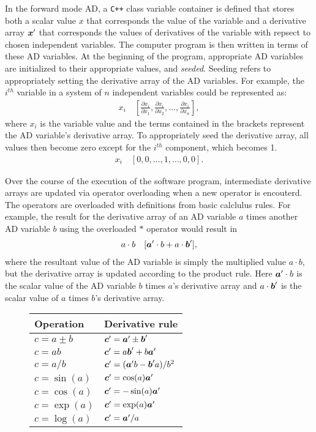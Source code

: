 In the forward mode AD, a \texttt{C++} class variable container is defined
that stores both a scalar value $x$ that corresponds the value of the variable
and a derivative array $\boldsymbol{x}'$ that corresponds the values of derivatives of
the variable with repsect to chosen independent variables. The computer
program is then written in terms of these AD variables. At the beginning of
the program, appropriate AD variables are initialized to their appropriate
values, and \emph{seeded}. Seeding refers to appropriately setting the
derivative array of the AD variables. For example, the $i^{th}$ variable in a
system of $n$ independent variables could be represented as:
%
\begin{gather}
x_i \quad
[ \frac{\partial x_i}{\partial x_1},
\frac{\partial x_i}{\partial x_2},
\dots, \frac{\partial x_i}{\partial x_n} ],
\end{gather}
%
where $x_i$ is the variable value and the terms contained in the brackets
represent the AD variable's derivative array. To appropriately seed the
derivative array, all values then become zero except for the $i^{th}$ component,
which becomes 1.
%
\begin{gather}
x_i \quad [0, 0, \dots, 1, \dots, 0, 0].
\end{gather}

Over the course of the execution of the software program, intermediate
derivative arrays are updated via operator overloading when a new operator is
encouterd. The operators are overloaded with definitions from basic calclulus
rules. For example, the result for the derivative array of an AD variable $a$
times another AD variable $b$ using the overloaded $*$ operator would result
in
%
\begin{gather}
a \cdot b \quad [ \boldsymbol{a}' \cdot  b + a \cdot \boldsymbol{b}' ],
\end{gather}
%
where the resultant value of the AD variable is simply the multiplied value
$a \cdot b$, but the derivative array is updated according to the product rule.
Here $\boldsymbol{a}' \cdot b$ is the scalar value of the AD variable $b$ times $a$'s
derivative array and $a \cdot \boldsymbol{b}'$ is the scalar value of $a$ times
$b$'s derivative array.

\begin{figure}
\centering
\begin{tabular}{|  l | l |}
\hline
Operation & Derivative rule \\ \hline
$c = a \pm b$ & $\boldsymbol{c}' = \boldsymbol{a}' \pm \boldsymbol{b}'$ \\ \hline
$c = ab$      & $\boldsymbol{c}' = a \boldsymbol{b}' + b \boldsymbol{a}'$ \\ \hline
$c = a/b$     & $\boldsymbol{c}' = (\boldsymbol{a}' b - \boldsymbol{b}' a) / b^2$ \\ \hline
$c = \sin(a)$  & $\boldsymbol{c}' = \cos(a) \boldsymbol{a}'$ \\ \hline
$c = \cos(a)$  & $\boldsymbol{c}' = -\sin(a) \boldsymbol{a}'$ \\ \hline
$c = \exp(a)$  & $\boldsymbol{c}' = \exp(a) \boldsymbol{a}'$ \\ \hline
$c = \log(a)$  & $\boldsymbol{c}' = \boldsymbol{a}'/a $ \\ \hline
\end{tabular}
\end{figure}

